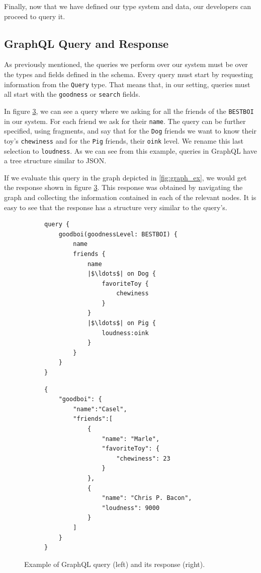 Finally, now that we have defined our type system and data, our developers can proceed to query it.

\subsection*{GraphQL Query and Response}

As previously mentioned, the queries we perform over our system must be over the types and fields defined in the schema. Every query must start by requesting information from the \texttt{Query} type. That means that, in our setting, queries must all start with the \texttt{goodness} or \texttt{search} fields.

In figure \ref{fig:qres_ex}, we can see a query where we asking for all the friends of the \texttt{BESTBOI} in our system. For each friend we ask for their \texttt{name}. The query can be further specified, using fragments, and say that for the \texttt{Dog} friends we want to know their toy's \texttt{chewiness} and for the \texttt{Pig} friends, their \texttt{oink} level. We rename this last selection to \texttt{loudness}. As we can see from this example, queries in GraphQL have a tree structure similar to JSON.

If we evaluate this query in the graph depicted in \ref{fig:graph_ex}, we would get the response shown in figure \ref{fig:qres_ex}. This response was obtained by navigating the graph and collecting the information contained in each of the relevant nodes. It is easy to see that the response has a structure very similar to the query's.

\begin{figure}
\centering
\begin{subfigure}{.5\textwidth}
\begin{verbatim}
query {
    goodboi(goodnessLevel: BESTBOI) {
        name
        friends {
            name
            |$\ldots$| on Dog {
                favoriteToy {
                    chewiness
                }
            }
            |$\ldots$| on Pig {
                loudness:oink
            }
        }
    }
}
\end{verbatim}
\label{fig:query_ex}
\end{subfigure}%
\begin{subfigure}{.5\textwidth}
\begin{verbatim}
{
    "goodboi": {
        "name":"Casel",
        "friends":[
            {
                "name": "Marle",
                "favoriteToy": {
                    "chewiness": 23
                }
            },
            {
                "name": "Chris P. Bacon",
                "loudness": 9000
            }
        ]
    }
}
\end{verbatim}
\label{fig:response_ex}
\end{subfigure}

\caption{Example of GraphQL query (left) and its response (right).}
\label{fig:qres_ex}
\end{figure}

